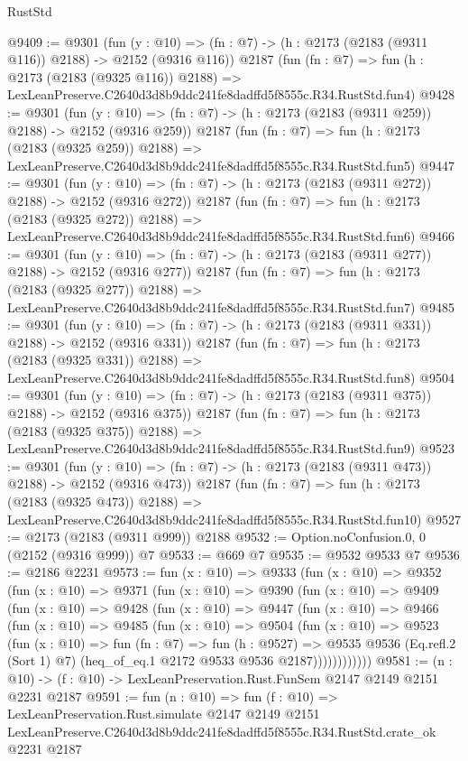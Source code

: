 \begin{lexlean}{RustStd}
\begin{coremodule}
@9409 := @9301
    (fun (y : @10) => (fn : @7) -> (h : @2173 (@2183 (@9311 @116)) @2188) -> @2152 (@9316 @116))
    @2187
    (fun (fn : @7) =>
    fun (h : @2173 (@2183 (@9325 @116)) @2188) =>
    LexLeanPreserve.C2640d3d8b9ddc241fe8dadffd5f8555c.R34.RustStd.fun4)
@9428 := @9301
    (fun (y : @10) => (fn : @7) -> (h : @2173 (@2183 (@9311 @259)) @2188) -> @2152 (@9316 @259))
    @2187
    (fun (fn : @7) =>
    fun (h : @2173 (@2183 (@9325 @259)) @2188) =>
    LexLeanPreserve.C2640d3d8b9ddc241fe8dadffd5f8555c.R34.RustStd.fun5)
@9447 := @9301
    (fun (y : @10) => (fn : @7) -> (h : @2173 (@2183 (@9311 @272)) @2188) -> @2152 (@9316 @272))
    @2187
    (fun (fn : @7) =>
    fun (h : @2173 (@2183 (@9325 @272)) @2188) =>
    LexLeanPreserve.C2640d3d8b9ddc241fe8dadffd5f8555c.R34.RustStd.fun6)
@9466 := @9301
    (fun (y : @10) => (fn : @7) -> (h : @2173 (@2183 (@9311 @277)) @2188) -> @2152 (@9316 @277))
    @2187
    (fun (fn : @7) =>
    fun (h : @2173 (@2183 (@9325 @277)) @2188) =>
    LexLeanPreserve.C2640d3d8b9ddc241fe8dadffd5f8555c.R34.RustStd.fun7)
@9485 := @9301
    (fun (y : @10) => (fn : @7) -> (h : @2173 (@2183 (@9311 @331)) @2188) -> @2152 (@9316 @331))
    @2187
    (fun (fn : @7) =>
    fun (h : @2173 (@2183 (@9325 @331)) @2188) =>
    LexLeanPreserve.C2640d3d8b9ddc241fe8dadffd5f8555c.R34.RustStd.fun8)
@9504 := @9301
    (fun (y : @10) => (fn : @7) -> (h : @2173 (@2183 (@9311 @375)) @2188) -> @2152 (@9316 @375))
    @2187
    (fun (fn : @7) =>
    fun (h : @2173 (@2183 (@9325 @375)) @2188) =>
    LexLeanPreserve.C2640d3d8b9ddc241fe8dadffd5f8555c.R34.RustStd.fun9)
@9523 := @9301
    (fun (y : @10) => (fn : @7) -> (h : @2173 (@2183 (@9311 @473)) @2188) -> @2152 (@9316 @473))
    @2187
    (fun (fn : @7) =>
    fun (h : @2173 (@2183 (@9325 @473)) @2188) =>
    LexLeanPreserve.C2640d3d8b9ddc241fe8dadffd5f8555c.R34.RustStd.fun10)
@9527 := @2173 (@2183 (@9311 @999)) @2188
@9532 := Option.noConfusion.{0, 0} (@2152 (@9316 @999)) @7
@9533 := @669 @7
@9535 := @9532 @9533 @7
@9536 := @2186 @2231
@9573 := fun (x : @10) =>
  @9333
    (fun (x : @10) =>
    @9352
      (fun (x : @10) =>
      @9371
        (fun (x : @10) =>
        @9390
          (fun (x : @10) =>
          @9409
            (fun (x : @10) =>
            @9428
              (fun (x : @10) =>
              @9447
                (fun (x : @10) =>
                @9466
                  (fun (x : @10) =>
                  @9485
                    (fun (x : @10) =>
                    @9504
                      (fun (x : @10) =>
                      @9523
                        (fun (x : @10) =>
                        fun (fn : @7) =>
                        fun (h : @9527) =>
                        @9535
                          @9536
                          (Eq.refl.{2} (Sort 1) @7)
                          (heq_of_eq.{1} @2172 @9533 @9536 @2187))))))))))))
@9581 := (n : @10) -> (f : @10) -> LexLeanPreservation.Rust.FunSem @2147 @2149 @2151 @2231 @2187
@9591 := fun (n : @10) =>
  fun (f : @10) =>
  LexLeanPreservation.Rust.simulate
    @2147
    @2149
    @2151
    LexLeanPreserve.C2640d3d8b9ddc241fe8dadffd5f8555c.R34.RustStd.crate_ok
    @2231
    @2187
\end{coremodule}
\end{lexlean}
